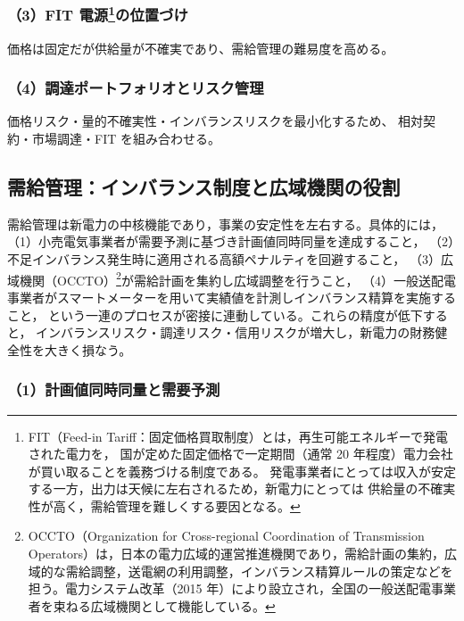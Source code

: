 \subsubsection{（3）FIT 電源\footnote{
FIT（Feed-in Tariff：固定価格買取制度）とは，再生可能エネルギーで発電された電力を，
国が定めた固定価格で一定期間（通常 20 年程度）電力会社が買い取ることを義務づける制度である。
発電事業者にとっては収入が安定する一方，出力は天候に左右されるため，新電力にとっては
供給量の不確実性が高く，需給管理を難しくする要因となる。
}の位置づけ}

価格は固定だが供給量が不確実であり、需給管理の難易度を高める。

\subsubsection{（4）調達ポートフォリオとリスク管理}

価格リスク・量的不確実性・インバランスリスクを最小化するため、
相対契約・市場調達・FIT を組み合わせる。


\subsection{需給管理：インバランス制度と広域機関の役割}

需給管理は新電力の中核機能であり，事業の安定性を左右する。具体的には，
（1）小売電気事業者が需要予測に基づき計画値同時同量を達成すること，
（2）不足インバランス発生時に適用される高額ペナルティを回避すること，
（3）広域機関（OCCTO）\footnote{OCCTO（Organization for Cross-regional Coordination of Transmission Operators）は，日本の電力広域的運営推進機関であり，需給計画の集約，広域的な需給調整，送電網の利用調整，インバランス精算ルールの策定などを担う。電力システム改革（2015 年）により設立され，全国の一般送配電事業者を束ねる広域機関として機能している。}が需給計画を集約し広域調整を行うこと，
（4）一般送配電事業者がスマートメーターを用いて実績値を計測しインバランス精算を実施すること，
という一連のプロセスが密接に連動している。これらの精度が低下すると，
インバランスリスク・調達リスク・信用リスクが増大し，新電力の財務健全性を大きく損なう。

\subsubsection*{\hspace{2em}（1）計画値同時同量と需要予測}

